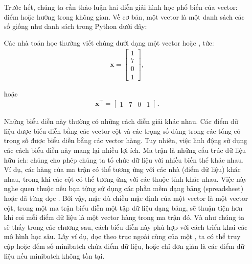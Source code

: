 \documentclass[letterpaper,11pt,english]{sphinxmanual}
\begin{document}
Trước hết, chúng ta cần thảo luận hai diễn giải hình học phổ biến của
vector: điểm hoặc hướng trong không gian. Về cơ bản, một vector là một
danh sách các số giống như danh sách trong Python dưới đây:

\begin{sphinxVerbatim}[commandchars=\\\{\}]
  \PYG{p}{[}   \PYG{p}{]}
\end{sphinxVerbatim}



Các nhà toán học thường viết chúng dưới dạng một vector  hoặc
, tức:
\begin{equation}\label{equation:chapter_appendix_math/geometry-linear-algebric-ops_vn:chapter_appendix_math/geometry-linear-algebric-ops_vn:0}
\begin{split}\mathbf{x} = \begin{bmatrix}1\\7\\0\\1\end{bmatrix},\end{split}
\end{equation}


hoặc
\begin{equation}\label{equation:chapter_appendix_math/geometry-linear-algebric-ops_vn:chapter_appendix_math/geometry-linear-algebric-ops_vn:1}
\begin{split}\mathbf{x}^\top = \begin{bmatrix}1 & 7 & 0 & 1\end{bmatrix}.\end{split}
\end{equation}


Những biểu diễn này thường có những cách diễn giải khác nhau. Các điểm
dữ liệu được biểu diễn bằng các vector cột và các trọng số dùng trong
các tổng có trọng số được biểu diễn bằng các vector hàng. Tuy nhiên,
việc linh động sử dụng các cách biểu diễn này mang lại nhiều lợi ích. Ma
trận là những cấu trúc dữ liệu hữu ích: chúng cho phép chúng ta tổ chức
dữ liệu với nhiều biến thể khác nhau. Ví dụ, các hàng của ma trận có thể
tương ứng với các nhà (điểm dữ liệu) khác nhau, trong khi các cột có thể
tương ứng với các thuộc tính khác nhau. Việc này nghe quen thuộc nếu bạn
từng sử dụng các phần mềm dạng bảng (spreadsheet) hoặc đã từng đọc
. Bởi vậy, mặc dù chiều mặc định của một vector là
một vector cột, trong một ma trận biểu diễn một tập dữ liệu dạng bảng,
sẽ thuận tiện hơn khi coi mỗi điểm dữ liệu là một vector hàng trong ma
trận đó. Và như chúng ta sẽ thấy trong các chương sau, cách biểu diễn
này phù hợp với cách triển khai các mô hình học sâu. Lấy ví dụ, dọc theo
trục ngoài cùng của một , ta có thể truy cập hoặc đếm số
minibatch chứa điểm dữ liệu, hoặc chỉ đơn giản là các điểm dữ liệu nếu
minibatch không tồn tại.
\end{document}
